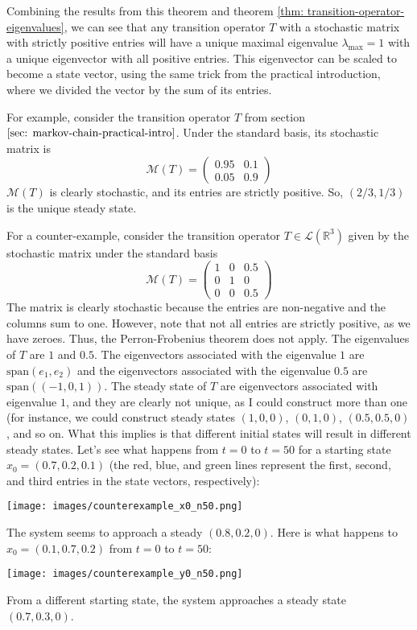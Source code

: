\documentclass{article}
\renewcommand{\L}{\mathcal{L}}
\newcommand{\spans}{\mathrm{span}}
\newcommand{\R}{\mathbb{R}}
\newcommand{\M}{\mathcal{M}}
\theoremstyle{definition}
\begin{document}
Combining the results from this theorem and theorem \ref{thm: transition-operator-eigenvalues}, we can see that any transition operator $T$ with a stochastic matrix with strictly positive entries will have a unique maximal eigenvalue $\lambda_{\text{max}} = 1$ with a unique eigenvector with all positive entries. This eigenvector can be scaled to become a state vector, using the same trick from the practical introduction, where we divided the vector by the sum of its entries.

For example, consider the transition operator $T$ from section $\ref{sec: markov-chain-practical-intro}$. Under the standard basis, its stochastic matrix is $$\M(T) = \begin{pmatrix}
    0.95 & 0.1 \\
    0.05 & 0.9
\end{pmatrix}$$
$\M(T)$ is clearly stochastic, and its entries are strictly positive. So, $(2/3, 1/3)$ is the unique steady state.

For a counter-example, consider the transition operator $T \in \L(\R^3)$ given by the stochastic matrix under the standard basis $$\M(T) = \begin{pmatrix}
    1 & 0 & 0.5 \\
    0 & 1 & 0 \\
    0 & 0 & 0.5
\end{pmatrix}$$
The matrix is clearly stochastic because the entries are non-negative and the columns sum to one. However, note that not all entries are strictly positive, as we have zeroes. Thus, the Perron-Frobenius theorem does not apply. The eigenvalues of $T$ are $1$ and $0.5$. The eigenvectors associated with the eigenvalue $1$ are $\spans(e_1, e_2)$ and the eigenvectors associated with the eigenvalue $0.5$ are $\spans((-1, 0, 1))$. The steady state of $T$ are eigenvectors associated with eigenvalue $1$, and they are clearly not unique, as I could construct more than one (for instance, we could construct steady states $(1, 0, 0)$, $(0, 1, 0)$, $(0.5, 0.5, 0)$, and so on. What this implies is that different initial states will result in different steady states. Let's see what happens from $t = 0$ to $t = 50$ for a starting state $x_0 = (0.7, 0.2, 0.1)$ (the red, blue, and green lines represent the first, second, and third entries in the state vectors, respectively):
\begin{center}
    \texttt{[image: images/counterexample\_x0\_n50.png]}
\end{center}
The system seems to approach a steady $(0.8, 0.2, 0)$. Here is what happens to $x_0 = (0.1, 0.7, 0.2)$ from $t = 0$ to $t = 50$:
\begin{center}
    \texttt{[image: images/counterexample\_y0\_n50.png]}
\end{center}
From a different starting state, the system approaches a steady state $(0.7, 0.3, 0)$. 
\end{document}
